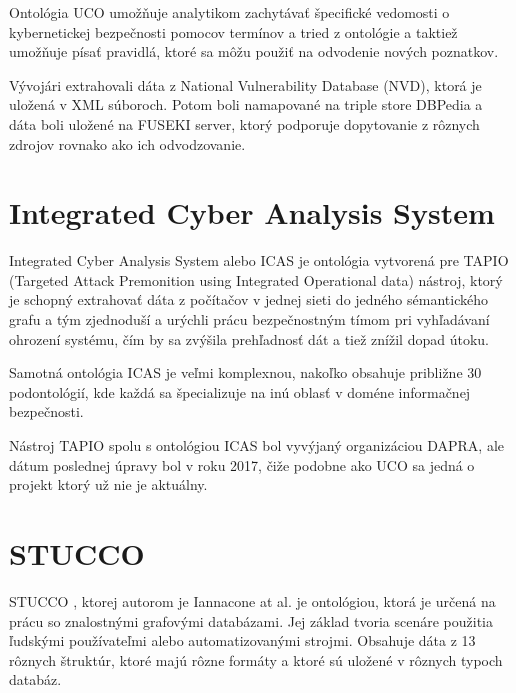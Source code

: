 \documentclass[12pt, a4paper, oneside]{book}
\begin{document}
Ontológia UCO umožňuje analytikom zachytávať špecifické vedomosti o kybernetickej bezpečnosti pomocov termínov a tried z ontológie a taktiež umožňuje písať pravidlá, ktoré sa môžu použiť na odvodenie nových poznatkov.


Vývojári extrahovali dáta z National Vulnerability Database (NVD), ktorá je uložená v XML súboroch. Potom boli namapované na triple store DBPedia a dáta boli uložené na FUSEKI server, ktorý podporuje dopytovanie z rôznych zdrojov rovnako ako ich odvodzovanie.



\section{Integrated Cyber Analysis System}
Integrated Cyber Analysis System\citep{salem2015enabling} alebo ICAS je ontológia vytvorená pre TAPIO (Targeted Attack Premonition using Integrated Operational data) nástroj, ktorý je schopný extrahovať dáta z počítačov v jednej sieti do jedného sémantického grafu a tým zjednoduší a urýchli prácu bezpečnostným tímom pri vyhľadávaní ohrození systému, čím by sa zvýšila prehľadnosť dát a tiež znížil dopad útoku. 


Samotná ontológia ICAS je veľmi komplexnou, nakoľko obsahuje približne 30 podontológií, kde každá sa špecializuje na inú oblasť v doméne informačnej bezpečnosti.


Nástroj TAPIO spolu s ontológiou ICAS bol vyvýjaný organizáciou DAPRA, ale dátum poslednej úpravy bol v roku 2017, čiže podobne ako UCO sa jedná o projekt ktorý už nie je aktuálny.


\section{STUCCO}
STUCCO \citep{stucco}, ktorej autorom je Iannacone at al. je ontológiou, ktorá je určená na prácu so znalostnými grafovými databázami. Jej základ tvoria scenáre použitia ľudskými používateľmi alebo automatizovanými strojmi. Obsahuje dáta z 13 rôznych štruktúr, ktoré majú rôzne formáty a ktoré sú uložené v rôznych typoch databáz. 
\end{document}
